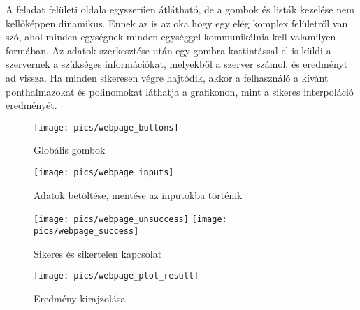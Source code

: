 	A feladat felületi oldala egyszerűen átlátható, de a gombok és listák kezelése nem kellőképpen dinamikus. Ennek az is az oka hogy egy elég komplex felületről van szó, ahol minden egységnek minden egységgel kommunikálnia kell valamilyen formában. \newline
	Az adatok szerkesztése után egy gombra kattintással el is küldi a szervernek a szükséges információkat, melyekből a szerver számol, és eredményt ad vissza. \newline
	Ha minden sikeresen végre hajtódik, akkor a felhasználó a kívánt ponthalmazokat és polinomokat láthatja a grafikonon, mint a sikeres interpoláció eredményét.

	\begin{figure}[h]
		\texttt{[image: pics/webpage\_buttons]}
		\centering
		\caption{Globális gombok\label{fig:webpage_buttons}}
	\end{figure}

	\begin{figure}[h]
		\texttt{[image: pics/webpage\_inputs]}
		\centering
		\caption{Adatok betöltése, mentése az inputokba történik \label{fig:webpage_inputs}}
	\end{figure}

	\begin{figure}[h]
		\texttt{[image: pics/webpage\_unsuccess]}
		\texttt{[image: pics/webpage\_success]}
		\centering
		\caption{Sikeres és sikertelen kapcsolat\label{fig:webpage_unsuccess}}
	\end{figure}

	\begin{figure}[h]
		\texttt{[image: pics/webpage\_plot\_result]}
		\centering
		\caption{Eredmény kirajzolása\label{fig:webpage_plot_result}}
	\end{figure}

